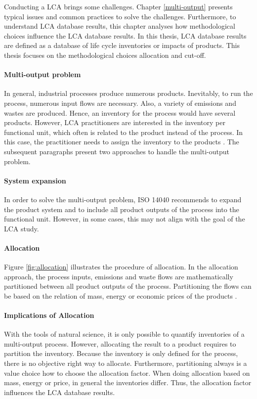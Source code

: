 Conducting a LCA brings some challenges. Chapter \ref{multi-output} presents typical issues and common practices to solve the challenges. Furthermore, to understand LCA database results, this chapter analyses how methodological choices influence the LCA database results. In this thesis, LCA database results are defined as a database of life cycle inventories or impacts of products. This thesis focuses on the methodological choices allocation and cut-off.


\paragraph{Multi-output problem} In general, industrial processes produce numerous products. Inevitably, to run the process, numerous input flows are necessary. Also, a variety of emissions and wastes are produced. Hence, an inventory for the process would have several products. However, LCA practitioners are interested in the inventory per functional unit, which often is related to the product instead of the process. In this case, the practitioner needs to assign the inventory to the products \cite{InternationalOrganizationforStandardization.2006}. The subsequent paragraphs present two approaches to handle the multi-output problem.

\paragraph{System expansion}In order to solve the multi-output problem, ISO 14040 \cite{InternationalOrganizationforStandardization.2006} recommends to expand the product system and to include all product outputs of the process into the functional unit. However, in some cases, this may not align with the goal of the LCA study.

\paragraph{Allocation}
Figure \ref{fig:allocation} illustrates the procedure of allocation. In the allocation approach, the process inputs, emissions and waste flows are mathematically partitioned between all product outputs of the process. Partitioning the flows can be based on the relation of mass, energy or economic prices of the products  \cite{InternationalOrganizationforStandardization.2006}.



\paragraph{Implications of Allocation} With the tools of natural science, it is only possible to quantify inventories of a multi-output process. However, allocating the result to a product requires to partition the inventory. Because the inventory is only defined for the process, there is no objective right way to allocate. Furthermore, partitioning always is a value choice how to choose the allocation factor. When doing allocation based on mass, energy or price, in general the inventories differ. Thus, the allocation factor influences the LCA database results.

